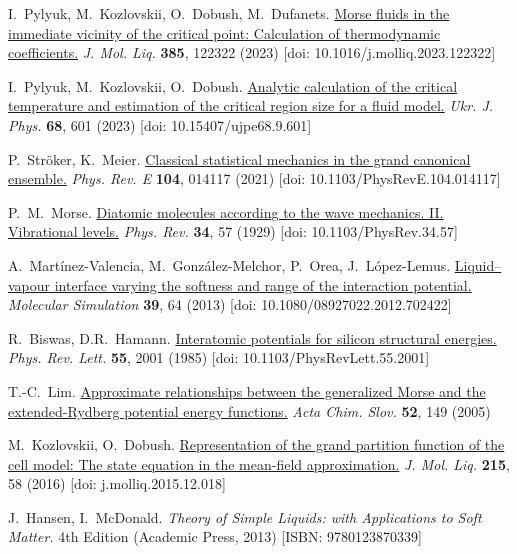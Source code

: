 \begin{thebibliography}{9}
		I.~Pylyuk, M.~Kozlovskii, O.~Dobush, M.~Dufanets.
	\href{https://www.sciencedirect.com/science/article/pii/S0167732223011261}{Morse fluids in the immediate vicinity of the critical point: Calculation of thermodynamic coefficients.} \textit{J. Mol. Liq.} \textbf{385}, 122322 (2023) [doi: 10.1016/j.molliq.2023.122322]
	
	 I.~Pylyuk, M.~Kozlovskii, O.~Dobush.
	\href{https://ujp.bitp.kiev.ua/index.php/ujp/article/view/2023197}{Analytic calculation of the critical temperature and estimation of the critical region size for a fluid model.} \textit{Ukr. J. Phys.} \textbf{68}, 601 (2023) [doi: 10.15407/ujpe68.9.601]
	
	 P.~Str\"oker, K.~Meier.
	\href{https://link.aps.org/doi/10.1103/PhysRevE.104.014117}{Classical
	statistical mechanics in the grand canonical ensemble.} \textit{Phys. Rev. E} \textbf{104}, 014117 (2021) [doi: 10.1103/PhysRevE.104.014117]
	
		P.~M.~Morse. \href{https://link.aps.org/doi/10.1103/PhysRev.34.57}{Diatomic
	molecules according to the wave mechanics. II. Vibrational levels.} \textit{Phys.
	Rev.} \textbf{34}, 57 (1929) [doi: 10.1103/PhysRev.34.57]
	
	 A.~Martínez-Valencia, M.~González-Melchor, P.~Orea, J.~López-Lemus.
	\href{https://doi.org/10.1080/08927022.2012.702422}{Liquid–vapour interface
	varying the softness and range of the interaction potential.} \textit{Molecular
	Simulation} \textbf{39}, 64 (2013) [doi: 10.1080/08927022.2012.702422]
	
	 R.~Biswas, D.R.~Hamann.
	\href{https://link.aps.org/doi/10.1103/PhysRevLett.55.2001}{Interatomic
	potentials for silicon structural energies.} \textit{Phys. Rev. Lett.} \textbf{55}, 2001 (1985) [doi: 10.1103/PhysRevLett.55.2001]
	
	 T.-C.~Lim. \href{https://acta-arhiv.chem-soc.si/52/52-2-149.htm}{Approximate
	relationships between the generalized Morse and the extended-Rydberg potential energy functions.} \textit{Acta Chim. Slov.} \textbf{52}, 149 (2005)
	
	 M.~Kozlovskii, O.~Dobush.
	\href{https://www.sciencedirect.com/science/article/pii/S0167732215312101}{Representation of the grand partition function of the cell model: The state equation in the mean-field approximation.} \textit{J. Mol. Liq.} \textbf{215}, 58 (2016) [doi: j.molliq.2015.12.018]
	
	 J.~Hansen, I.~McDonald. \textit{Theory of Simple Liquids: with Applications to Soft Matter.} 4th Edition (Academic Press, 2013) [ISBN: 9780123870339]
	
		
\end{thebibliography}
	